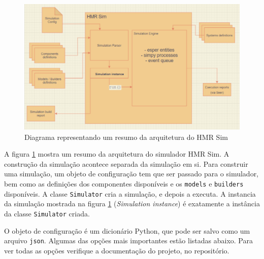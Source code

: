 \begin{figure}[ht]
    \centering
    \includegraphics[width=\textwidth]{img/architecture_overview.png}
    \caption{Diagrama representando um resumo da arquitetura do HMR Sim}
    \label{fig:architecture_overview}
\end{figure}

A figura \ref{fig:architecture_overview} mostra um resumo da arquitetura do simulador HMR Sim. A construção da simulação acontece separada da simulação em si. Para construir uma simulação, um objeto de configuração tem que ser passado para o simulador, bem como as definições dos componentes disponíveis e os \texttt{models} e \texttt{builders} disponíveis. A classe \texttt{Simulator} cria a simulação, e depois a executa. A instancia da simulação mostrada na figura \ref{fig:architecture_overview} (\textit{Simulation instance}) é exatamente a instância da classe \texttt{Simulator} criada.

O objeto de configuração é um dicionário Python, que pode ser salvo como um arquivo \texttt{json}. Algumas das opções mais importantes estão listadas abaixo. Para ver todas as opções verifique a documentação do projeto, no repositório.

